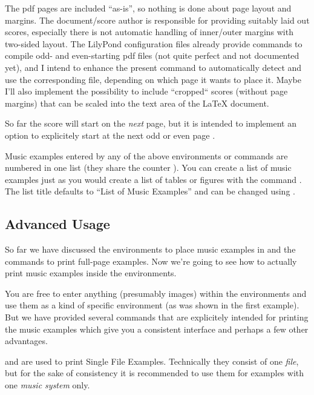 \documentclass[../openLilyLib]{subfiles}
\begin{document}
\begin{knownIssues}
The pdf pages are included “as-is”, so nothing is done about page layout and margins.
The document/score author is responsible for providing suitably laid out scores, especially there is not automatic handling of inner/outer margins with two-sided layout.
The LilyPond configuration files already provide commands to compile odd- and even-starting pdf files (not quite perfect and not documented yet), and I intend to enhance the present command to automatically detect and use the corresponding file, depending on which page it wants to place it.
Maybe I'll also implement the possibility to include “cropped“ scores (without page margins) that can be scaled into the text area of the \LaTeX{} document.

So far the score will start on the \emph{next} page, but it is intended to implement an option to explicitely start at the next odd or even page .
\end{knownIssues}

\bigskip
Music examples entered by any of the above environments or commands are numbered in one list (they share the counter ).
You can create a list of music examples just as you would create a list of tables or figures with the command .
The list title defaults to “List of Music Examples” and can be changed using .


\subsection{Advanced Usage}
\label{subsec:xmp_advanced-usage}

So far we have discussed the environments to place music examples in and the commands to print full-page examples.
Now we're going to see how to actually print music examples inside the environments.

You are free to enter anything (presumably images) within the environments and use them as a kind of specific  environment (as was shown in the first example).
But we have provided several commands that are explicitely intended for printing the music examples which give you a consistent interface and perhaps a few other advantages.

 and  are used to print Single File Examples.
Technically they consist of one \emph{file}, but for the sake of consistency it is recommended to use them for examples with one \emph{music system} only.
\end{document}

